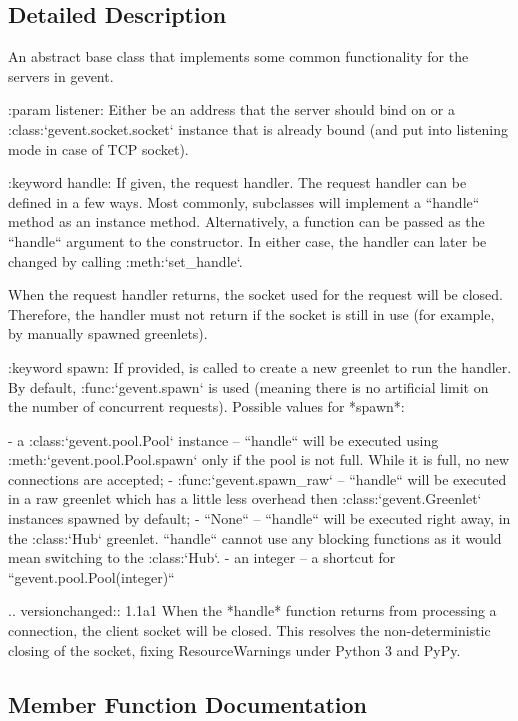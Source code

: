 \subsection{Detailed Description}
\begin{DoxyVerb}An abstract base class that implements some common functionality for the servers in gevent.

:param listener: Either be an address that the server should bind
    on or a :class:`gevent.socket.socket` instance that is already
    bound (and put into listening mode in case of TCP socket).

:keyword handle: If given, the request handler. The request
    handler can be defined in a few ways. Most commonly,
    subclasses will implement a ``handle`` method as an
    instance method. Alternatively, a function can be passed
    as the ``handle`` argument to the constructor. In either
    case, the handler can later be changed by calling
    :meth:`set_handle`.

    When the request handler returns, the socket used for the
    request will be closed. Therefore, the handler must not return if
    the socket is still in use (for example, by manually spawned greenlets).

:keyword spawn: If provided, is called to create a new
    greenlet to run the handler. By default,
    :func:`gevent.spawn` is used (meaning there is no
    artificial limit on the number of concurrent requests). Possible values for *spawn*:

    - a :class:`gevent.pool.Pool` instance -- ``handle`` will be executed
      using :meth:`gevent.pool.Pool.spawn` only if the pool is not full.
      While it is full, no new connections are accepted;
    - :func:`gevent.spawn_raw` -- ``handle`` will be executed in a raw
      greenlet which has a little less overhead then :class:`gevent.Greenlet` instances spawned by default;
    - ``None`` -- ``handle`` will be executed right away, in the :class:`Hub` greenlet.
      ``handle`` cannot use any blocking functions as it would mean switching to the :class:`Hub`.
    - an integer -- a shortcut for ``gevent.pool.Pool(integer)``

.. versionchanged:: 1.1a1
   When the *handle* function returns from processing a connection,
   the client socket will be closed. This resolves the non-deterministic
   closing of the socket, fixing ResourceWarnings under Python 3 and PyPy.\end{DoxyVerb}
 

\subsection{Member Function Documentation}
\mbox{\label{classgevent_1_1baseserver_1_1_base_server_a7a6ba0220eb15221727c629460dfceb9}} 
